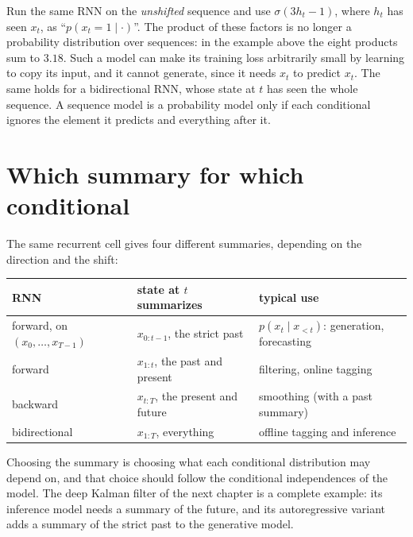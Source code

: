 \begin{notechapter}
\begin{pitfall}
Run the same RNN on the \emph{unshifted} sequence and use $\sigma(3h_t - 1)$, where $h_t$ has seen $x_t$, as
``$p(x_t = 1\mid\cdot)$''. The product of these factors is no longer a probability distribution over
sequences: in the example above the eight products sum to $3.18$. Such a model can make
its training loss arbitrarily small by learning to copy its input, and it cannot generate,
since it needs $x_t$ to predict $x_t$. The same holds for a bidirectional RNN, whose state at $t$ has seen
the whole sequence. A sequence model is a probability model only if each conditional
ignores the element it predicts and everything after it.
\end{pitfall}

\section{Which summary for which conditional}\label{sequence-models:sec:which}

The same recurrent cell gives four different summaries, depending on the direction and
the shift:
\begin{center}\small
\begin{tabular}{p{}p{}p{}}
\textbf{RNN} & \textbf{state at $t$ summarizes} & \textbf{typical use}\\\hline
forward, on $(x_0,\dots,x_{T-1})$ & $x_{0:t-1}$, the strict past & $p(x_t\mid x_{<t})$: generation, forecasting\\
forward & $x_{1:t}$, the past and present & filtering, online tagging\\
backward & $x_{t:T}$, the present and future & smoothing (with a past summary)\\
bidirectional & $x_{1:T}$, everything & offline tagging and inference
\end{tabular}
\end{center}
Choosing the summary is choosing what each conditional distribution may depend on, and
that choice should follow the conditional independences of the model. The deep Kalman filter
of the next chapter is a complete example: its inference model needs a summary of the
future, and its autoregressive variant adds a summary of the strict past to the generative model.


\end{notechapter}
